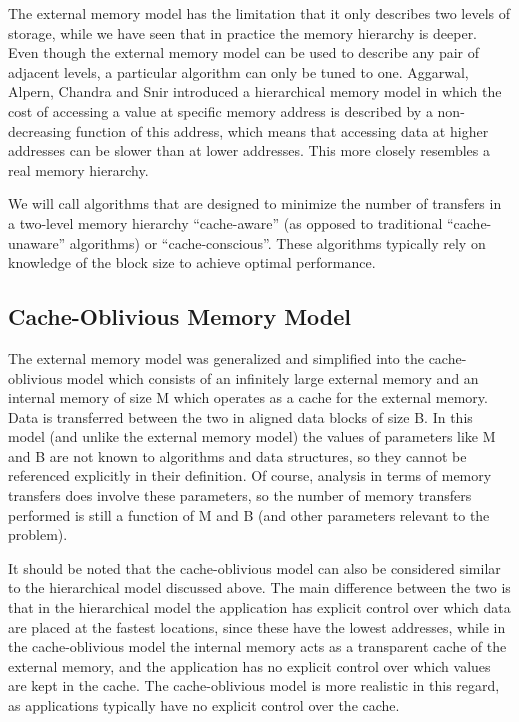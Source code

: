 \documentclass{acm_proc_article-sp}
\begin{document}
The external memory model has the limitation that it only describes two levels of storage, while we have seen that in practice the memory hierarchy is deeper. Even though the external memory model can be used to describe any pair of adjacent levels, a particular algorithm can only be tuned to one. Aggarwal, Alpern, Chandra and Snir \cite{aggarwal1987mhm} introduced a hierarchical memory model in which the cost of accessing a value at specific memory address is described by a non-decreasing function of this address, which means that accessing data at higher addresses can be slower than at lower addresses. This more closely resembles a real memory hierarchy.

We will call algorithms that are designed to minimize the number of transfers in a two-level memory hierarchy ``cache-aware'' (as opposed to traditional ``cache-unaware'' algorithms) or ``cache-conscious''. These algorithms typically rely on knowledge of the block size to achieve optimal performance.

\subsection{Cache-Oblivious Memory Model}
The external memory model was generalized and simplified into the cache-oblivious model \cite{prokop1999coa} which consists of an infinitely large external memory and an internal memory of size M which operates as a cache for the external memory. Data is transferred between the two in aligned data blocks of size B. In this model (and unlike the external memory model) the values of parameters like M and B are not known to algorithms and data structures, so they cannot be referenced explicitly in their definition. Of course, analysis in terms of memory transfers does involve these parameters, so the number of memory transfers performed is still a function of M and B (and other parameters relevant to the problem).

It should be noted that the cache-oblivious model can also be considered similar to the hierarchical model discussed above. The main difference between the two is that in the hierarchical model the application has explicit control over which data are placed at the fastest locations, since these have the lowest addresses, while in the cache-oblivious model the internal memory acts as a transparent cache of the external memory, and the application has no explicit control over which values are kept in the cache. The cache-oblivious model is more realistic in this regard, as applications typically have no explicit control over the cache.
\end{document}
